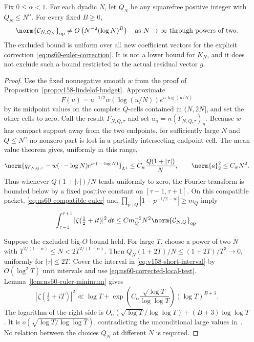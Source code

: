 \begin{proposition}
\label{prop:ns60-growing-euler-obstruction}
Fix $0\leq\alpha<1$. For each dyadic $N$, let $Q_N$ be any squarefree
positive integer with $Q_N\leq N^\alpha$. For every fixed $B\geq0$,
\begin{equation}
 \norm{\mathcal C_{N,Q_N}}_{\rm op}
 \ne O\left(N^{-2}(\log N)^B\right)
 \quad\text{as }N\to\infty\text{ through powers of two}.
 \label{eq:ns60-growing-no-log}
\end{equation}
The excluded bound is uniform over all new coefficient vectors for the
explicit correction~\eqref{eq:ns60-euler-correction}. It is not a lower
bound for $K_N$, and it does not exclude such a bound restricted to the
actual residual vector $g$.
\end{proposition}
\begin{proof}
Use the fixed nonnegative smooth $w$ from the proof of
Proposition~\ref{prop:v158-lindelof-budget}. Approximate
\[
 F(u)=u^{-1/2}w(\log(u/N))e^{i\tau\log(u/N)}
\]
by its midpoint values on the complete $Q$-cells contained in $(N,2N]$,
and set the other cells to zero. Call the result $F_{N,Q,\tau}$ and set
$a_n=n(F_{N,Q,\tau})_n$. Because $w$ has compact support away from the
two endpoints, for sufficiently large $N$ and $Q\leq N^\alpha$ no
nonzero part is lost in a partially intersecting endpoint cell.
The mean value theorem gives, uniformly in this range,
\begin{equation}
 \norm{q_{F_{N,Q,\tau}}
       -w(\,\cdot-\log N)e^{i\tau(\,\cdot-\log N)}}_{L^1}
 \leq C_w\frac{Q(1+|\tau|)}N,
 \qquad \norm{a}_2^2\leq C_wN^2.
 \label{eq:ns60-packet-grid-error}
\end{equation}
Thus whenever $Q(1+|\tau|)/N$ tends uniformly to zero, the Fourier
transform is bounded below by a fixed positive constant on
$[\tau-1,\tau+1]$. On this compatible packet,
\eqref{eq:ns60-compatible-euler} and
$\prod_{p\mid Q}|1-p^{-1/2-it}|\geq m_Q$ imply
\begin{equation}
 \int_{\tau-1}^{\tau+1}|\zeta(\tfrac12+it)|^2\,dt
 \leq C m_Q^{-2} N^2\norm{\mathcal C_{N,Q}}_{\rm op}.
 \label{eq:ns60-corrected-local-test}
\end{equation}

Suppose the excluded big-$O$ bound held. For large $T$, choose a power
of two $N$ with
$T^{2/(1-\alpha)}\leq N<2T^{2/(1-\alpha)}$.
Then $Q_N(1+2T)/N\leq(1+2T)/T^2\to0$, uniformly for
$|\tau|\leq2T$. Cover the interval in
\eqref{eq:v158-short-interval} by $O(\log^2T)$ unit intervals and use
\eqref{eq:ns60-corrected-local-test}. Lemma~\ref{lem:ns60-euler-minimum}
gives
\[
 |\zeta(\tfrac12+iT)|^2
 \ll \log T+
 \exp\left(C_\alpha\frac{\sqrt{\log T}}{\log\log T}\right)
 (\log T)^{B+3}.
\]
The logarithm of the right side is
$O_\alpha(\sqrt{\log T}/\log\log T)+(B+3)\log\log T$.
It is $o(\sqrt{\log T/\log\log T})$, contradicting the unconditional
large values in~\cite[Theorem 1]{Soundararajan2008}.
No relation between the choices $Q_N$ at different $N$ is required.
\end{proof}


